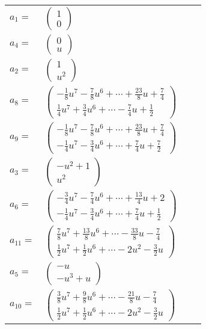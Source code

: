 \documentclass[1p]{elsarticle_modified}
\theoremstyle{definition}
\begin{document}
\begin{tabular}{m{7pt} m{180pt} m{7pt} m{180pt} }
\flushright $a_{1}=$&$\begin{pmatrix}1\\0\end{pmatrix}$ \\
\flushright $a_{4}=$&$\begin{pmatrix}0\\u\end{pmatrix}$ \\
\flushright $a_{2}=$&$\begin{pmatrix}1\\u^2\end{pmatrix}$ \\
\flushright $a_{8}=$&$\begin{pmatrix}-\frac{1}{8} u^7-\frac{7}{8} u^6+\cdots+\frac{23}{8} u+\frac{7}{4}\\\frac{1}{4} u^7+\frac{3}{4} u^6+\cdots-\frac{7}{4} u+\frac{1}{2}\end{pmatrix}$ \\
\flushright $a_{9}=$&$\begin{pmatrix}-\frac{1}{8} u^7-\frac{7}{8} u^6+\cdots+\frac{23}{8} u+\frac{7}{4}\\-\frac{1}{4} u^7-\frac{3}{4} u^6+\cdots+\frac{7}{4} u+\frac{7}{2}\end{pmatrix}$ \\
\flushright $a_{3}=$&$\begin{pmatrix}- u^2+1\\u^2\end{pmatrix}$ \\
\flushright $a_{6}=$&$\begin{pmatrix}-\frac{3}{4} u^7-\frac{7}{4} u^6+\cdots+\frac{13}{4} u+2\\-\frac{1}{4} u^7-\frac{3}{4} u^6+\cdots+\frac{7}{4} u+\frac{1}{2}\end{pmatrix}$ \\
\flushright $a_{11}=$&$\begin{pmatrix}\frac{7}{8} u^7+\frac{13}{8} u^6+\cdots-\frac{33}{8} u-\frac{7}{4}\\\frac{1}{2} u^7+\frac{1}{2} u^6+\cdots-2 u^2-\frac{3}{2} u\end{pmatrix}$ \\
\flushright $a_{5}=$&$\begin{pmatrix}- u\\- u^3+u\end{pmatrix}$ \\
\flushright $a_{10}=$&$\begin{pmatrix}\frac{3}{8} u^7+\frac{9}{8} u^6+\cdots-\frac{21}{8} u-\frac{7}{4}\\\frac{1}{2} u^7+\frac{1}{2} u^6+\cdots-2 u^2-\frac{3}{2} u\end{pmatrix}$ \\

\end{tabular}
\end{document}
